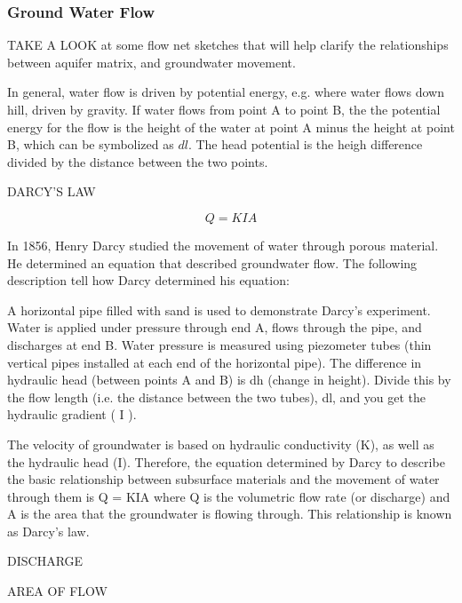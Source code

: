 \documentclass{book}\usepackage{knitr}
\begin{document}
\subsubsection{Ground Water Flow}

TAKE A LOOK at some flow net sketches that will help clarify the relationships between aquifer matrix, and groundwater movement.

In general, water flow is driven by potential energy, e.g.  where water flows down hill, driven by gravity. If water flows from point A to point B, the the potential energy for the flow is the height of the water at point A minus the height at point B, which can be symbolized as $dl$. The head potential is the heigh difference divided by the distance between the two points.  

DARCY'S LAW

\begin{equation}
Q = KIA
\end{equation}

In 1856, Henry Darcy studied the movement of water through porous material. He determined an equation that described groundwater flow. The following description tell how Darcy determined his equation:

A horizontal pipe filled with sand is used to demonstrate Darcy's experiment. Water is applied under pressure through end A, flows through the pipe, and discharges at end B. Water pressure is measured using piezometer tubes (thin vertical pipes installed at each end of the horizontal pipe). The difference in hydraulic head (between points A and B) is dh (change in height). Divide this by the flow length (i.e. the distance between the two tubes), dl, and you get the hydraulic gradient ( I ).

The velocity of groundwater is based on hydraulic conductivity (K), as well as the hydraulic head (I). Therefore, the equation determined by Darcy to describe the basic relationship between subsurface materials and the movement of water through them is Q = KIA where Q is the volumetric flow rate (or discharge) and A is the area that the groundwater is flowing through. This relationship is known as Darcy’s law.

DISCHARGE

AREA OF FLOW
\end{document}
